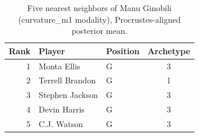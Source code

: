 \begin{table}[htbp]
  \centering\small
  \begin{tabular}{rllc}
    \toprule
    Rank & Player & Position & Archetype \\
    \midrule
    1 & Monta Ellis & G & 3 \\
    2 & Terrell Brandon & G & 1 \\
    3 & Stephen Jackson & G & 3 \\
    4 & Devin Harris & G & 3 \\
    5 & C.J. Watson & G & 3 \\
    \bottomrule
  \end{tabular}
  \caption{Five nearest neighbors of Manu Ginobili (curvature_m1 modality), Procrustes-aligned posterior mean.}
  \label{tab:Manu_Ginobili_neighbors_curvature_m1}
\end{table}

